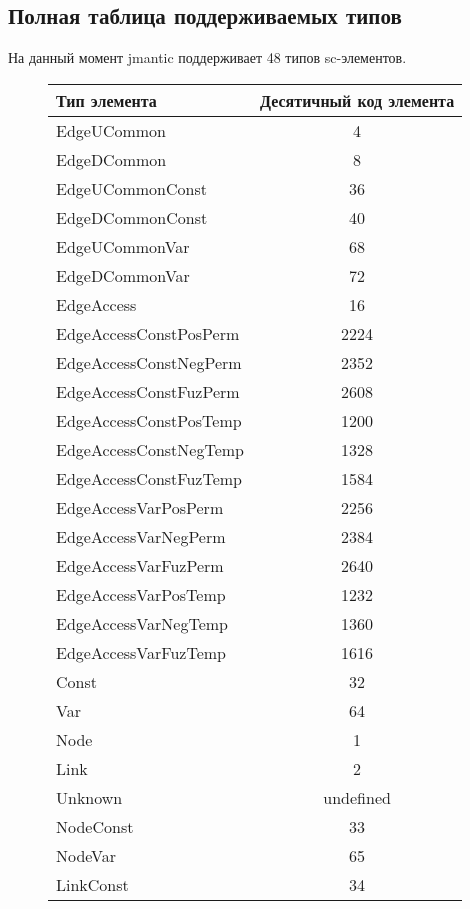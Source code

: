 \subsection{Полная таблица поддерживаемых типов}
На данный момент jmantic поддерживает 48 типов sc-элементов. 
\begin{figure}[H]
    \centering
    \begin{tabular}{  | p{50mm} | c | }
    \rowcolor{gray!50}
		\hline
		Тип элемента & Десятичный код элемента \\
        \hline
		EdgeUCommon & 4 \\
		\hline
		EdgeDCommon & 8 \\
		\hline
		EdgeUCommonConst & 36 \\
		\hline
		EdgeDCommonConst & 40 \\
		\hline
		EdgeUCommonVar & 68 \\
		\hline
		EdgeDCommonVar & 72 \\
		\hline
		EdgeAccess & 16 \\
		\hline
		EdgeAccessConstPosPerm & 2224 \\
		\hline
		EdgeAccessConstNegPerm & 2352 \\
		\hline
		EdgeAccessConstFuzPerm & 2608 \\
		\hline
		EdgeAccessConstPosTemp & 1200 \\
		\hline
		EdgeAccessConstNegTemp & 1328 \\
		\hline
		EdgeAccessConstFuzTemp & 1584 \\
		\hline
		EdgeAccessVarPosPerm & 2256 \\
		\hline
		EdgeAccessVarNegPerm & 2384 \\
		\hline
		EdgeAccessVarFuzPerm & 2640 \\
		\hline
		EdgeAccessVarPosTemp & 1232 \\
		\hline
		EdgeAccessVarNegTemp & 1360 \\
		\hline
		EdgeAccessVarFuzTemp & 1616 \\
		\hline
		Const & 32 \\
		\hline
		Var & 64 \\
		\hline
		Node & 1 \\
		\hline
		Link & 2 \\
		\hline
		Unknown & undefined \\
		\hline
		NodeConst & 33 \\
		\hline
		NodeVar & 65 \\
		\hline
		LinkConst & 34 \\

\end{tabular}
\end{figure}
